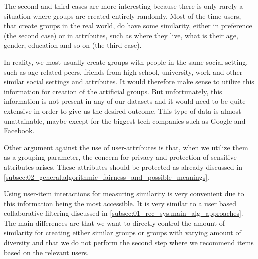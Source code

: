 The second and third cases are more interesting because there is only rarely a situation where groups are created entirely randomly. Most of the time users, that create groups in the real world, do have some similarity, either in preference (the second case) or in attributes, such as where they live, what is their age, gender, education and so on (the third case).

In reality, we most usually create groups with people in the same social setting, such as age related peers, friends from high school, university, work and other similar social settings and attributes. It would therefore make sense to utilize this information for creation of the artificial groups. But unfortunately, this information is not present in any of our datasets and it would need to be quite extensive in order to give us the desired outcome. This type of data is almost unattainable, maybe except for the biggest tech companies such as Google and Facebook.

Other argument against the use of user-attributes is that, when we utilize them as a grouping parameter, the concern for privacy and protection of sensitive attributes arises. These attributes should be protected as already discussed in \ref{subsec:02_general.algorithmic_fairness_and_possible_meanings}.

Using user-item interactions for measuring similarity is very convenient due to this information being the most accessible. It is very similar to a user based collaborative filtering discussed in \ref{subsec:01_rec_sys.main_alg_approaches}. The main differences are that we want to directly control the amount of similarity for creating either similar groups or groups with varying amount of diversity and that we do not perform the second step where we recommend items based on the relevant users.



